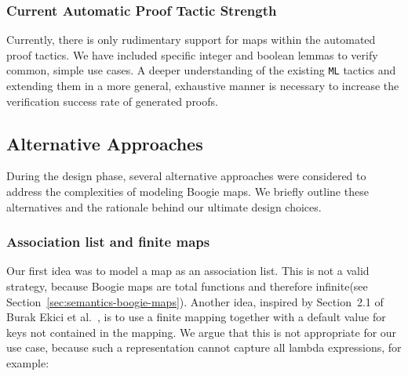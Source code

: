 \documentclass[11pt]{article}
\begin{document}
\subsubsection{Current Automatic Proof Tactic Strength}
Currently, there is only rudimentary support for maps within the automated proof tactics.
We have included specific integer and boolean lemmas to verify common, simple use cases.
A deeper understanding of the existing \texttt{ML} tactics and extending them in a more general, exhaustive manner
is necessary to increase the verification success rate of generated proofs.




\subsection{Alternative Approaches}

During the design phase, several alternative approaches were considered to address the complexities of modeling Boogie maps. We briefly outline these alternatives and the rationale behind our ultimate design choices.

\subsubsection{Association list and finite maps}

Our first idea was to model a map as an association list.
This is not a valid strategy, because Boogie maps are total functions and therefore infinite(see Section~\ref{sec:semantics-boogie-maps}).
Another idea, inspired by Section~2.1 of Burak Ekici et al.~\cite{ekici2017smtcoq},
is to use a finite mapping together with a default value for keys not contained in the mapping.
We argue that this is not appropriate for our use case,
because such a representation cannot capture all lambda expressions,
for example:
\end{document}
